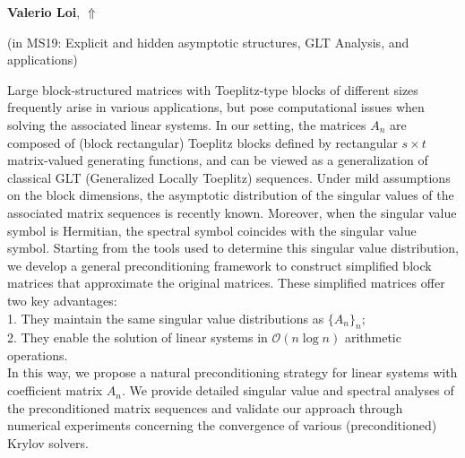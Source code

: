 \documentclass[ILAS2025-program.tex]{subfiles}
\begin{document}
     \hypertarget{down0173}{}\begin{ilasabstract}
    
    \textbf{Valerio Loi},  \hfill \hyperlink{up0173}{$\Uparrow$}
    
    (in {\color{mstitle}MS19: Explicit and hidden asymptotic structures, GLT Analysis, and applications})
        
        \mtskip
    Large block-structured matrices with Toeplitz-type blocks of different sizes frequently arise in various applications, but pose computational issues when solving the associated linear systems. In our setting, the matrices \(A_n\) are composed of (block rectangular) Toeplitz blocks defined by rectangular \(s \times t\) matrix-valued generating functions, and can be viewed as a generalization of classical GLT (Generalized Locally Toeplitz) sequences. Under mild assumptions on the block dimensions, the asymptotic distribution of the singular values of the associated matrix sequences is recently known. Moreover, when the singular value symbol is Hermitian, the spectral symbol coincides with the singular value symbol. Starting from the tools used to determine this singular value distribution, we develop a general preconditioning framework to construct simplified block matrices that approximate the original matrices. These simplified matrices offer two key advantages:\\
1. They maintain the same singular value distributions as \(\{A_n\}_{n}\); \\
2. They enable the solution of linear systems in \(\mathcal{O}(n \log n)\) arithmetic operations.\\
In this way, we propose a natural preconditioning strategy for linear systems with coefficient matrix \(A_n\). We provide detailed singular value and spectral analyses of the preconditioned matrix sequences and validate our approach through numerical experiments concerning the convergence of various (preconditioned) Krylov solvers.
\end{ilasabstract}
\end{document}
